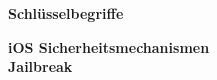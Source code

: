%
%
% 
% 
% 

\begin{center}
{\Large\bfseries Schlüsselbegriffe}
\end{center}

\noindent
\textbf{iOS Sicherheitsmechanismen } \\
\textbf{Jailbreak } \\
